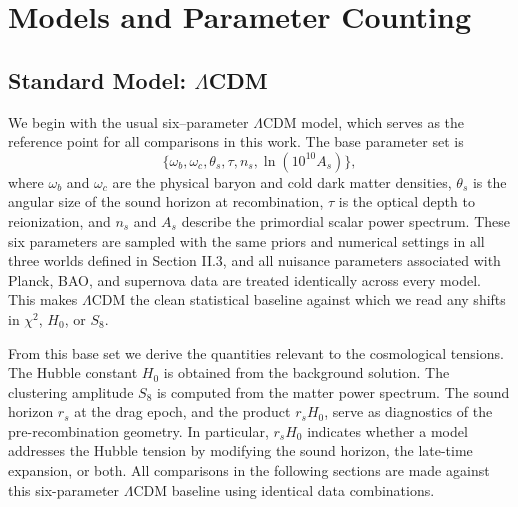 \documentclass[a4paper,11pt]{article}
\begin{document}
\section{Models and Parameter Counting}


\subsection{Standard Model: $\Lambda$CDM}
\label{sec:lcdm}

We begin with the usual six--parameter $\Lambda$CDM model, which serves as the reference point for all comparisons in this work. The base parameter set is
\begin{equation}
\{\omega_b, \omega_c, \theta_s, \tau, n_s, \ln(10^{10} A_s)\},
\end{equation}
where $\omega_b$ and $\omega_c$ are the physical baryon and cold dark matter densities, $\theta_s$ is the angular size of the sound horizon at recombination, $\tau$ is the optical depth to reionization, and $n_s$ and $A_s$ describe the primordial scalar power spectrum. These six parameters are sampled with the same priors and numerical settings in all three worlds defined in Section II.3, and all nuisance parameters associated with Planck, BAO, and supernova data are treated identically across every model. This makes $\Lambda$CDM the clean statistical baseline against which we read any shifts in $\chi^2$, $H_0$, or $S_8$.

From this base set we derive the quantities relevant to the cosmological tensions. The Hubble constant $H_0$ is obtained from the background solution. The clustering amplitude $S_8$ is computed from the matter power spectrum. The sound horizon $r_s$ at the drag epoch, and the product $r_s H_0$, serve as diagnostics of the pre-recombination geometry. In particular, $r_s H_0$ indicates whether a model addresses the Hubble tension by modifying the sound horizon, the late-time expansion, or both. All comparisons in the following sections are made against this six-parameter $\Lambda$CDM baseline using identical data combinations.

\end{document}
